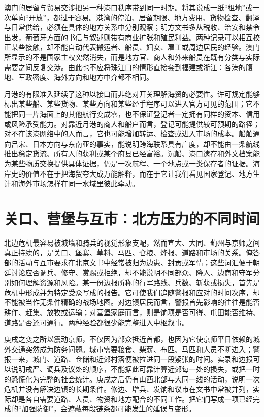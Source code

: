澳门的居留与贸易交涉把另一种港口秩序带到同一时期。将其说成一纸“租地”或一次单向“开放”，都过于容易。港湾的停泊、居留期限、地方费用、货物检查、翻译与日常供给，必须在具体的地方关系中分别观察；明方文书多从税收、治安和禁令出发，葡萄牙方面的书信与叙述则带有商业扩张和殖民利益。两种记录可以相互校正某些接触，却不能自动代表搬运者、船员、妇女、雇工或周边居民的经验。澳门所显示的不是国家主权突然消失，而是地方官、商人和外来船员在既有分类与实际需要之间反复交涉。由此也不应将珠江口的情形直接套到福建或浙江：各港的腹地、军政密度、海外方向和地方中介都不相同。

月港的有限准入延续了这种以接口而非绝对开关理解海贸的必要性。许可规定能够标出某些船、某些货物、某些方向和某些经手程序可以进入官方可见的范围；它不能把同一片海面上的其他航行变成零，也不保证登记者一定拥有同样的资本、信用或风险承受能力。对靠近月港的商人和船户而言，登记可能提供较可预期的路径；对不在该港网络中的人而言，它也可能增加转运、检查或进入市场的成本。船舶通向吕宋、日本方向与东南亚的事实，能说明跨海联系具有广度，却不能由一条航线推出稳定货流、所有人的获利或某个府县已经富裕。沉船、港口遗存和外文档案能为某些物质交换提供具体证据，仍是一次航程、一个地点或一类保存者的证据。海岸史的价值不在于把海贸夸大成万能解释，而在于它让我们看见国家登记、地方生计和海外市场怎样在同一水域里彼此牵动。

\section{关口、营堡与互市：北方压力的不同时间}

北边危机最容易被城墙和骑兵的视觉形象支配，然而宣大、大同、蓟州与京师之间真正持续的，是关口、堡寨、草料、马匹、仓粮、烽报、道路和市场的关系。俺答部的活动与互市要求在北京文书中经常被归为边患、封贡或军情；这些词汇便于朝廷讨论应否调兵、修守、赏赐或拒绝，却不能说明不同部众、降人、边商和守军分别如何理解资源和风险。某一份边报所称的行军路线、兵数、斩获或损失，首先是危机中形成并为特定受众写成的报告。它可使我们追随警报和应对的时间次序，却不能被当作无条件精确的战场地图。对边镇居民而言，警报首先影响的往往是能否耕作、赶集、放牧或运输；对营堡家庭而言，则是饷项是否可得、屯田能否维持、道路是否还可通行。两种经验都很少能完整进入中枢叙事。

庚戌之变之所以震动京师，不仅因为部众抵近首都，也因为它使京师平日依赖的城外交通突然成为防务问题。城市需要粮食、柴薪、布匹、马匹和人员不断进入；警报一来，城门、道路、仓储和近郊村落便被拉进同一段紧张的时间。实录和边报可以说明戒严、调兵及议处的顺序，不能据此可靠计算近郊每一处的损失，或把一时的恐慌化为完整的社会统计。庚戌之后仍有山西北部与大同一线的活动，说明一次危机并没有解决边镇的长期条件。修边、增兵、发饷和议市在文书中常被并列，实际却是各自需要道路、人员、物资和地方配合的不同工作。把它们写成一项已经完成的“加强防御”，会遮蔽每段链条都可能发生的延误与变形。

